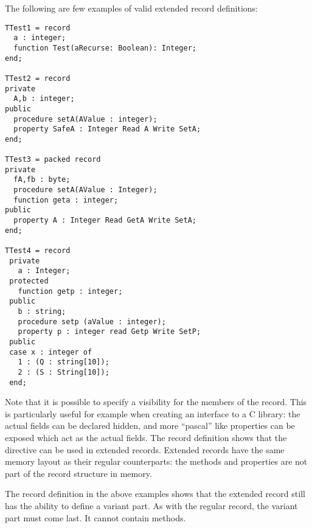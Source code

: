 The following are few examples of valid extended record definitions:
\begin{verbatim}
TTest1 = record
  a : integer;
  function Test(aRecurse: Boolean): Integer;
end;

TTest2 = record
private
  A,b : integer;
public
  procedure setA(AValue : integer);
  property SafeA : Integer Read A Write SetA;
end;

TTest3 = packed record
private
  fA,fb : byte;
  procedure setA(AValue : Integer);
  function geta : integer;
public
  property A : Integer Read GetA Write SetA;
end;

TTest4 = record
 private
   a : Integer;
 protected
   function getp : integer;
 public
   b : string;
   procedure setp (aValue : integer);
   property p : integer read Getp Write SetP;
 public
 case x : integer of
   1 : (Q : string[10]);
   2 : (S : String[10]);
 end;
\end{verbatim}
Note that it is possible to specify a visibility for the members of the
record. This is particularly useful for example when creating an interface
to a C library: the actual fields can be declared hidden, and more ``pascal''
like properties can be exposed which act as the actual fields.
The  record definition shows that the  directive can
be used in extended records. Extended records have the same memory layout as
their regular counterparts: the methods and properties are not part of the
record structure in memory.

The  record definition in the above examples shows that the
extended record still has the ability to define a variant part. As with the
regular record, the variant part must come last. It cannot contain methods.

